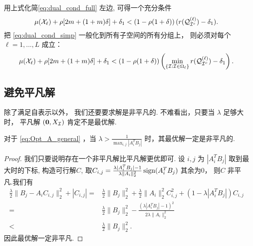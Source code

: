 用上式化简\eqref{eq:dual_cond_full} 左边, 可得一个充分条件
\begin{equation}\label{eq:dual_cond_simp}
  \mu(\mathcal{X}_{\ell}) +\rho [2m+(1+m)\delta] +\delta_1
  < \left(1-\rho(1+\delta)\right)(r(\mathcal{Q}_{\mathcal{I}^c}^{(\ell)})-\delta_1).
\end{equation}
把 \eqref{eq:dual_cond_simp} 一般化到所有子空间的所有分组上，
则必须对每个\(\ell = 1,...,L\) 成立：
\begin{equation}\label{eq:Thm1_all}
  \mu(\mathcal{X}_{\ell}) +\rho [2m+(1+m)\delta] +\delta_1
  < \left(1-\rho(1+\delta)\right)\left(\min_{\{\mathcal{I}: \mathcal{I}\in \Omega_\ell\}}r(\mathcal{Q}^{(\ell)}_{\mathcal{I}^c})-\delta_1\right).
\end{equation}

\subsection{避免平凡解}\label{sec:avoid_trivial}
除了满足自表示以外， 我们还要要求解是非平凡的. 不难看出，只要当 \(\lambda\)
足够大时， 平凡解 \((\mathbf{0}, X_{\mathcal{I}})\) 肯定不是最优解.

\begin{lemma}\label{lemma:avoid_trivial}
  对于 \eqref{eq:Opt_A_general} ，当 \(\lambda > \frac{1}{\max_{i,j} |A_i^T
B_j|}\) 时，其最优解一定是非平凡的.
\end{lemma}
\begin{proof}
  我们只要说明存在一个非平凡解比平凡解更优即可. 设 \(i, j\) 为 \(|A_i^T
  B_j|\) 取到最大时的下标, 构造可行解\(C\), 
  取\(C_{i,j} = \frac{\lambda |A_i^T B_j|-1}{\lambda \|A_i\|_2^2} \operatorname{sign}(A_i^T B_j)\) 
  其余为\(0\)， 则\(C\) 非平凡.我们有
  \begin{align*}
    \frac{\lambda}{2} \|B_j - A_i C_{i, j} \|_2^2 + |C_{i, j}| =& \frac{\lambda}{2}
    \|B_j\|_2^2 + \frac{\lambda}{2} \|A_i\|_2^2 C_{i,j}^2 +\left( 1-\lambda |A_i^T B_j|
    \right)C_{i,j} \\
    =&\frac{\lambda}{2} \|B_j\|_2^2 - \frac{(\lambda|A_i^T B_j| -1)^2}
    {2 \lambda \|A_i\|_2^2 }\\
    <& \frac{\lambda}{2} \|B_j\|_2^2. 
  \end{align*}
  因此最优解一定非平凡.
\end{proof}


